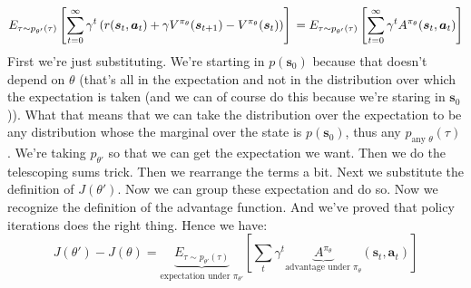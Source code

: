 \documentclass{report}
\begin{document}
\begin{equation}
E_{ \tau \sim p_{ \theta' } (\tau) }
\left[ 
\sum_{t=0}^{\infty} \gamma^{ t } \left( 
r (\bm{s}_{t}, \bm{a}_{t} ) + \gamma V^{ \pi_{ \theta } } (\bm{s}_{t+1})
- V^{ \pi_{ \theta } } (\bm{s}_{t})
\right) 
\right] \\
=
E_{ \tau \sim p_{ \theta' } (\tau) }
\left[ \sum_{t=0}^{\infty} \gamma^{ t } A^{ \pi_{ \theta } } (\bm{s}_{t}, \bm{a}_{t} ) \right] 
\end{equation}
First we're just substituting.
We're starting in $ p (\bm{s}_{0})  $ because that doesn't depend on $ \theta  $ (that's all in the expectation and not in the distribution over which 
the expectation is taken (and we can of course do this because we're staring in $ \bm{s}_{0}  $)).
What that means that we can take the distribution over the expectation to be any distribution  whose
the marginal over the state is $ p (\bm{s}_{0})  $, thus any $ p_{ \text{any  } \theta} (\tau) $.
We're taking $ p_{ \theta' }  $ so that we can get the expectation we want.
Then we do the telescoping sums trick.
Then we rearrange the terms a bit.
Next we substitute the definition of $ J (\theta')  $.
Now we can group these expectation and do so. Now we recognize the definition of the advantage function.
And we've proved that policy iterations does the right thing.
Hence we have:
\begin{equation}
J(\theta') - J (\theta) = 
\underbrace{E_{ \tau \sim p_{ \theta' } (\tau) } }_{ \text{expectation under } \pi_{ \theta' } }
\left[ \sum_{t}^{} \gamma^{ t } 
		\underbrace{A^{ \pi_{ \theta } } }_{ \text{advantage under } \pi_{ \theta }}
(\bm{s}_{t}, \bm{a}_{t} ) \right] 
\end{equation}
\end{document}
